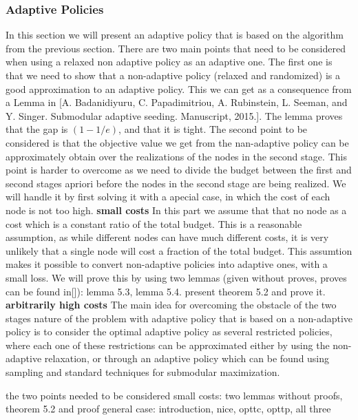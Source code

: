 \subsubsection{Adaptive Policies}
In this section we will present an adaptive policy that is based on the algorithm from the previous section. There are two main points that need to be considered when using a relaxed non adaptive policy as an adaptive one. The first one is that we need to show that a non-adaptive policy (relaxed and randomized) is a good approximation to an adaptive policy. This we can get as a consequence from a Lemma in [A. Badanidiyuru, C. Papadimitriou, A. Rubinstein, L. Seeman, and Y. Singer. Submodular
adaptive seeding. Manuscript, 2015.]. The lemma proves that the gap is $(1 - 1/e)$, and that it is tight. The second point to be considered is that the objective value we get from the nan-adaptive policy can be approximately obtain over the realizations of the nodes in the second stage. This point is harder to overcome as we need to divide the budget between the first and second stages apriori before the nodes in the second stage are being realized. We will handle it by first solving it with a apecial case, in which the cost of each node is not too high.
\textbf{small costs}
In this part we assume that that no node as a cost which is a constant ratio of the total budget. This is a reasonable assumption, as while different nodes can have much different costs, it is very unlikely that a single node will cost a fraction of the total budget. This assumtion makes it possible to convert non-adaptive policies into adaptive ones, with a small loss. We will prove this by using two lemmas (given without proves, proves can be found in[]):
lemma 5.3, lemma 5.4.
present theorem 5.2 and prove it.
\textbf{arbitrarily high costs}
The main idea for overcoming the obstacle of the two stages nature of the problem with adaptive policy that is based on a non-adaptive policy is to consider the optimal adaptive policy as several restricted policies, where each one of these restrictions can be approximated either by using the non-adaptive relaxation, or through an adaptive policy which can be found using sampling and standard techniques for submodular maximization.



the two points needed to be considered
small costs: two lemmas without proofs, theorem 5.2 and proof
general case: introduction, nice, opttc, opttp, all three 